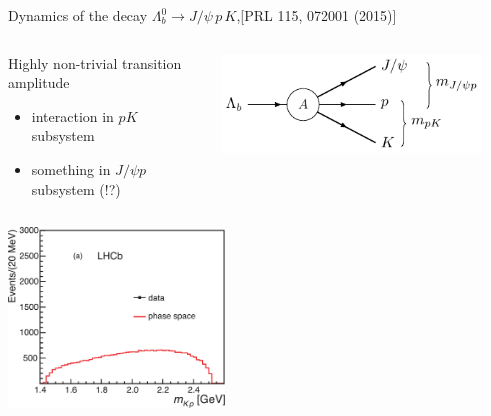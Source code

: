 \documentclass[aspectratio=169]{beamer}
\begin{document}
\begin{frame}{Dynamics of the decay $\Lambda_b^0\to J/\psi\,p\,K$,\hfill \scriptsize[PRL 115, 072001 (2015)]}{}%
\begin{columns}
    \begin{column}{0.6\textwidth}
        \begin{exampleblock}{}
            Highly non-trivial transition amplitude
            \begin{itemize}
                \item interaction in $pK$ subsystem
                \item something in $J/\psi p$ subsystem (!?)
            \end{itemize}
        \end{exampleblock}
    \end{column}
    \begin{column}{0.38\textwidth}
        \includegraphics[width=0.9\textwidth]{inline-figs/Penta_decay_indication.pdf}
    \end{column}
\end{columns}
\centering
{}
{\includegraphics[width=0.43\textwidth]{figs/PcOld/mkp-phsp_phase_space.pdf}}

\end{frame}
\end{document}
